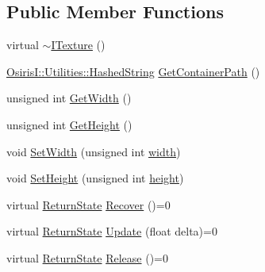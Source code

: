 \subsection*{Public Member Functions}
\begin{DoxyCompactItemize}
\item 
virtual \hyperlink{class_osiris_i_1_1_graphics_1_1_actors_1_1_i_texture_ac51c8c0b43b8806ef427f9ab5b9b00a5}{$\sim$\-I\-Texture} ()
\item 
\hyperlink{class_osiris_i_1_1_utilities_1_1_hashed_string}{Osiris\-I\-::\-Utilities\-::\-Hashed\-String} \hyperlink{class_osiris_i_1_1_graphics_1_1_actors_1_1_i_texture_a4a62e66cbb82d21a9029f713644f9802}{Get\-Container\-Path} ()
\item 
unsigned int \hyperlink{class_osiris_i_1_1_graphics_1_1_actors_1_1_i_texture_a102f90a60734ada743f441e2c793bb77}{Get\-Width} ()
\item 
unsigned int \hyperlink{class_osiris_i_1_1_graphics_1_1_actors_1_1_i_texture_aebfa9c3e09ca575a8d4aba4596e614c3}{Get\-Height} ()
\item 
void \hyperlink{class_osiris_i_1_1_graphics_1_1_actors_1_1_i_texture_ae99c70039104ac7363a7123b07334f92}{Set\-Width} (unsigned int \hyperlink{class_osiris_i_1_1_graphics_1_1_actors_1_1_i_texture_a92baa55e7bac29480756a9e63eda3679}{width})
\item 
void \hyperlink{class_osiris_i_1_1_graphics_1_1_actors_1_1_i_texture_a164eb2d4e9ff3dbaf92d561b3e98f728}{Set\-Height} (unsigned int \hyperlink{class_osiris_i_1_1_graphics_1_1_actors_1_1_i_texture_a82537ccd8499c03add6f073048f50104}{height})
\item 
virtual \hyperlink{namespace_osiris_i_a8f53bf938dc75c65c6a529694514013e}{Return\-State} \hyperlink{class_osiris_i_1_1_graphics_1_1_actors_1_1_i_texture_a2e531f9111db1c3ad0c78aa04cfe4b18}{Recover} ()=0
\item 
virtual \hyperlink{namespace_osiris_i_a8f53bf938dc75c65c6a529694514013e}{Return\-State} \hyperlink{class_osiris_i_1_1_graphics_1_1_actors_1_1_i_texture_a5d34810a8e83015d38e4d15a523b3941}{Update} (float delta)=0
\item 
virtual \hyperlink{namespace_osiris_i_a8f53bf938dc75c65c6a529694514013e}{Return\-State} \hyperlink{class_osiris_i_1_1_graphics_1_1_actors_1_1_i_texture_ae82753b56d039e4639c3ff9533e3100a}{Release} ()=0
\end{DoxyCompactItemize}
